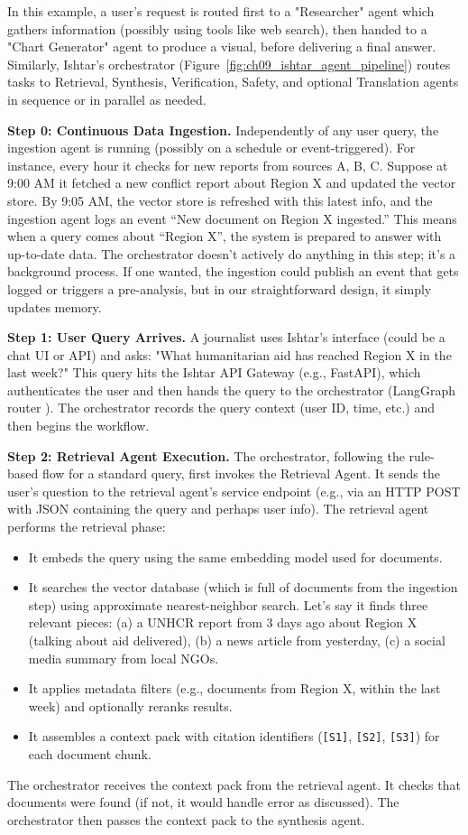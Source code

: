 In this example, a user's request is routed first to a "Researcher" agent which gathers information (possibly using tools like web search), then handed to a "Chart Generator" agent to produce a visual, before delivering a final answer. Similarly, Ishtar's orchestrator (Figure~\ref{fig:ch09_ishtar_agent_pipeline}) routes tasks to Retrieval, Synthesis, Verification, Safety, and optional Translation agents in sequence or in parallel as needed.

\textbf{Step 0: Continuous Data Ingestion.} Independently of any user query, the ingestion agent is running (possibly on a schedule or event-triggered). For instance, every hour it checks for new reports from sources A, B, C. Suppose at 9:00 AM it fetched a new conflict report about Region X and updated the vector store. By 9:05 AM, the vector store is refreshed with this latest info, and the ingestion agent logs an event “New document on Region X ingested.” This means when a query comes about “Region X”, the system is prepared to answer with up-to-date data. The orchestrator doesn’t actively do anything in this step; it’s a background process. If one wanted, the ingestion could publish an event that gets logged or triggers a pre-analysis, but in our straightforward design, it simply updates memory.

\textbf{Step 1: User Query Arrives.} A journalist uses Ishtar's interface (could be a chat UI or API) and asks: "What humanitarian aid has reached Region X in the last week?" This query hits the Ishtar API Gateway (e.g., FastAPI), which authenticates the user and then hands the query to the orchestrator (LangGraph router \cite{langchain}). The orchestrator records the query context (user ID, time, etc.) and then begins the workflow.

\textbf{Step 2: Retrieval Agent Execution.} The orchestrator, following the rule-based flow for a standard query, first invokes the Retrieval Agent. It sends the user's question to the retrieval agent's service endpoint (e.g., via an HTTP POST with JSON containing the query and perhaps user info). The retrieval agent performs the retrieval phase:
\begin{itemize}
  \item It embeds the query using the same embedding model used for documents.
  \item It searches the vector database (which is full of documents from the ingestion step) using approximate nearest-neighbor search. Let's say it finds three relevant pieces: (a) a UNHCR report from 3 days ago about Region X (talking about aid delivered), (b) a news article from yesterday, (c) a social media summary from local NGOs.
  \item It applies metadata filters (e.g., documents from Region X, within the last week) and optionally reranks results.
  \item It assembles a context pack with citation identifiers (\texttt{[S1]}, \texttt{[S2]}, \texttt{[S3]}) for each document chunk.
\end{itemize}
The orchestrator receives the context pack from the retrieval agent. It checks that documents were found (if not, it would handle error as discussed). The orchestrator then passes the context pack to the synthesis agent.

